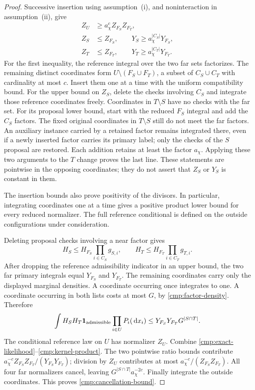 \begin{proof}
Successive insertion using assumption~\textup{(i)}, and noninteraction in
assumption~\textup{(ii)}, give
\begin{align}
 Z_U&\ge a_\chi^c Z_{F_S}Z_{F_T},
       \label{cmp:union-normalizer}\\
 Z_S&\le Z_{F_S},\qquad
 Y_S\ge a_\chi^{|C_S|}Y_{F_S},
       \label{cmp:single-normalizers}\\
 Z_T&\le Z_{F_T},\qquad
 Y_T\ge a_\chi^{|C_T|}Y_{F_T}.
       \label{cmp:other-normalizers}
\end{align}
For the first inequality, the reference integral over the two far sets
factorizes. The remaining distinct coordinates form
$U\setminus(F_S\cup F_T)$, a subset of $C_S\cup C_T$ with cardinality
at most $c$. Insert them one at a time with the uniform compatibility
bound. For the upper
bound on $Z_S$, delete the checks involving $C_S$ and integrate those reference
coordinates freely. Coordinates in $T\setminus S$ have no checks with the
far set. For its proposal lower bound, start with the reduced $F_S$ integral
and add the $C_S$ factors. The fixed original coordinates in
$T\setminus S$ still do not meet the far factors. An auxiliary instance
carried by a retained factor remains integrated there, even if a newly
inserted factor carries its primary label; only the checks of the $S$
proposal are restored. Each addition retains at
least the factor $a_\chi$. Applying these two arguments to the $T$ change proves the
last line. These statements are pointwise in the opposing coordinates;
they do not assert that $Z_S$ or $Y_S$ is constant in them.

The insertion bounds also prove positivity of the divisors. In particular,
integrating coordinates one at a time gives a positive product lower bound
for every reduced normalizer. The full reference conditional is defined on
the outside configurations under consideration.

Deleting proposal checks involving a near factor gives
\[
 H_S\le H_{F_S}\prod_{i\in C_S}g_{S,i},
 \qquad
 H_T\le H_{F_T}\prod_{i\in C_T}g_{T,i}.
\]
After dropping the reference admissibility indicator in an upper bound,
the two far primary integrals equal $Y_{F_S}$ and $Y_{F_T}$. The remaining
coordinates carry only the displayed marginal densities. A coordinate
occurring once integrates to one. A coordinate occurring in both lists
costs at most $G$, by \eqref{cmp:factor-density}. Therefore
\begin{equation}\label{cmp:kernel-product}
 \int H_SH_T\mathbf 1_{\mathrm{admissible}}
              \prod_{i\in U}P_i(\,\mathrm d x_i)
 \le Y_{F_S}Y_{F_T}G^{|S\cap T|}.
\end{equation}
The conditional reference law on $U$ has normalizer $Z_U$. Combine
\eqref{cmp:exact-likelihood}--\eqref{cmp:kernel-product}. The two pointwise
ratio bounds contribute
$a_\chi^{-c}Z_{F_S}Z_{F_T}/(Y_{F_S}Y_{F_T})$; division by $Z_U$
contributes at most $a_\chi^{-c}/(Z_{F_S}Z_{F_T})$. All four far
normalizers cancel, leaving $G^{|S\cap T|}a_\chi^{-2c}$.
Finally integrate the outside coordinates. This proves
\eqref{cmp:cancellation-bound}.
\end{proof}

